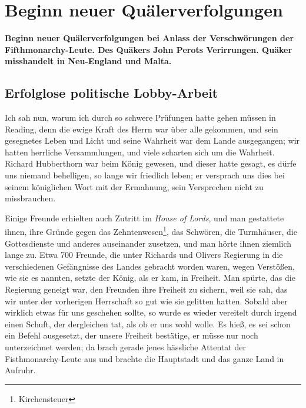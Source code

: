 
\chapter[Beginn neuer Quälerverfolgungen]{Beginn neuer Quälerverfolgungen}

\begin{center}
\textbf{Beginn neuer Quälerverfolgungen bei Anlass der Verschwörungen
der Fifthmonarchy-Leute. Des Quäkers John Perots Verirrungen.
Quäker misshandelt in Neu-England und Malta.}
\end{center}

\section{Erfolglose politische Lobby-Arbeit}

Ich sah nun, warum ich durch so schwere Prüfungen hatte
gehen müssen in Reading, denn die ewige Kraft des Herrn war
über alle gekommen, und sein gesegnetes Leben und Licht und
seine Wahrheit war dem Lande ausgegangen; wir hatten herrliche 
Versammlungen, und viele scharten sich um die Wahrheit.
Richard Hubberthorn war beim König 
gewesen, und dieser hatte
gesagt, es dürfe uns niemand behelligen, so lange wir friedlich
leben; er versprach uns dies bei seinem königlichen Wort mit der
Ermahnung, sein Versprechen nicht zu missbrauchen. 


Einige Freunde erhielten auch Zutritt im 
\textit{House of Lords}, und man
gestattete ihnen, ihre Gründe gegen das 
Zehntenwesen\footnote{Kirchensteuer}, 
das Schwören, die Turmhäuser, die Gottesdienste und anderes 
auseinander zusetzen, und man hörte ihnen ziemlich lange zu. 
Etwa 700 Freunde,
die unter Richards und Olivers Regierung in die verschiedenen
Gefängnisse des Landes gebracht worden waren, wegen Verstößen,
wie sie es nannten, setzte der König, als er kam, in Freiheit.
Man spürte, das die Regierung geneigt war, den Freunden ihre
Freiheit zu sichern, weil sie sah, das wir unter der vorherigen
Herrschaft so gut wie sie gelitten hatten. Sobald aber wirklich
etwas für uns geschehen sollte, so wurde es wieder vereitelt durch
irgend einen Schuft, der dergleichen tat, als ob er uns wohl
wolle. Es hieß, es sei schon ein Befehl ausgesetzt, der unsere
Freiheit bestätige, er müsse nur noch unterzeichnet werden; da
brach gerade jenes hässliche Attentat der 
Fisthmonarchy-Leute
aus und brachte die Hauptstadt 
und das ganze Land in Aufruhr.


